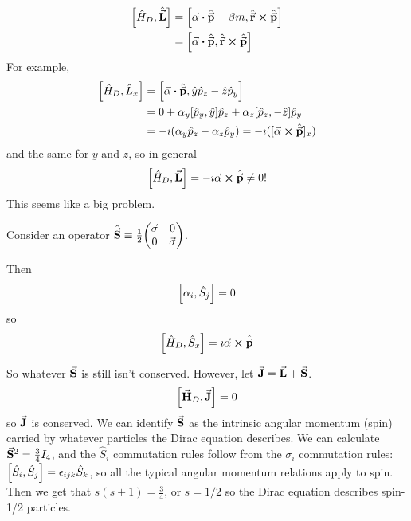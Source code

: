 \documentclass[a4paper,twoside,master.tex]{subfiles}
\begin{document}
\begin{align}
    \comm{\hat{H}_D}{\hat{\va{L}}} &= \comm{\va{\alpha} \vdot \hat{\va{p}} - \beta m}{\hat{\va{r}} \cross \hat{\va{p}}} \\
    &= \comm{\va{\alpha} \vdot \hat{\va{p}}}{\hat{\va{r}} \cross \hat{\va{p}}}
\end{align}
For example,
\begin{align}
    \comm{\hat{H}_D}{\hat{L}_x} &= \comm{\va{\alpha} \vdot \hat{\va{p}}}{\hat{y} \hat{p}_z - \hat{z} \hat{p}_y} \\
    &= 0 + \alpha_y \comm{\hat{p}_y}{\hat{y}} \hat{p}_z + \alpha_z \comm{\hat{p}_z}{- \hat{z}} \hat{p}_y \\
    &= - \imath(\alpha_y \hat{p}_z - \alpha_z \hat{p}_y) = - \imath([\va{\alpha} \cross \hat{\va{p}}]_x)
\end{align}
and the same for $ y $ and $ z $, so in general
\begin{equation}
    \comm{\hat{H}_D}{\va{L}} = - \imath \va{\alpha} \cross \hat{\va{p}} \neq 0!
\end{equation}
This seems like a big problem.

Consider an operator $ \hat{\va{S}} \equiv \frac{1}{2} \mqty( \va{\sigma} & 0 \\ 0 & \va{\sigma}) $. 

Then
\begin{equation}
    \comm{\alpha_i}{\hat{S}_j} = 0
\end{equation}
so
\begin{equation}
    \comm{\hat{H}_D}{\hat{S}_x} = \imath \va{\alpha} \cross \hat{\va{p}}
\end{equation}

So whatever $ \va{S} $ is still isn't conserved. However, let $ \va{J} = \va{L} + \va{S} $.
\begin{equation}
    \comm{\va{H}_D}{\va{J}} = 0
\end{equation}
so $ \va{J} $ is conserved. We can identify $ \va{S} $ as the intrinsic angular momentum (spin) carried by whatever particles the Dirac equation describes. We can calculate $ \va{S}^2 = \frac{3}{4} I_4 $, and the $ \hat{S}_i $ commutation rules follow from the $ \sigma_i $ commutation rules: $ \comm{\hat{S}_i}{\hat{S}_j} = \epsilon_{ijk} \hat{S}_k $, so all the typical angular momentum relations apply to spin. Then we get that $ s(s+1) = \frac{3}{4} $, or $ s = 1/2 $ so the Dirac equation describes spin-1/2 particles.
\end{document}

